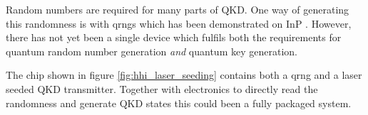 Random numbers are required for many parts of \ac{QKD}. One way of generating this randomness is with \acp{qrng} which has been demonstrated on \ac{InP} \cite{FrancescoThesis,Abellan2016}. However, there has not yet been a single device which fulfils both the requirements for quantum random number generation \textit{and} quantum key generation.

The chip shown in figure \ref{fig:hhi_laser_seeding} contains both a \ac{qrng} and a laser seeded \ac{QKD} transmitter. Together with electronics to directly read the randomness and generate \ac{QKD} states this could been a fully packaged system.

